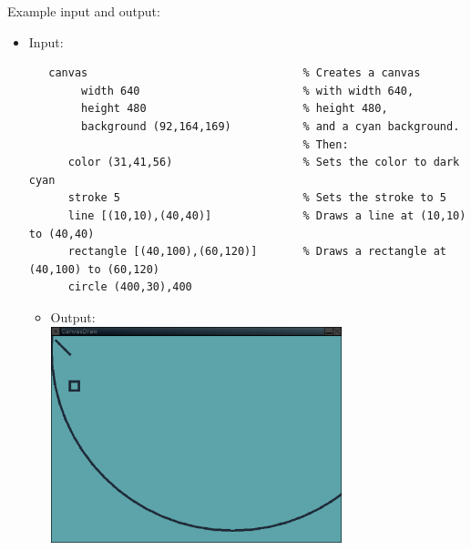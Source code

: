 \documentclass[a4paper,twoside,onecolumn]{article}
\begin{document}
Example input and output:
\begin{itemize}
\item Input:
\begin{verbatim}
   canvas                                 % Creates a canvas
        width 640                         % with width 640,
        height 480                        % height 480,
        background (92,164,169)           % and a cyan background.
                                          % Then:
      color (31,41,56)                    % Sets the color to dark cyan
      stroke 5                            % Sets the stroke to 5
      line [(10,10),(40,40)]              % Draws a line at (10,10) to (40,40)
      rectangle [(40,100),(60,120)]       % Draws a rectangle at (40,100) to (60,120)
      circle (400,30),400      
\end{verbatim}
\begin{itemize} \item Output: \\
\includegraphics[width=0.70\textwidth]{canvas1.eps}
\end{itemize}


\end{itemize}
\end{document}
